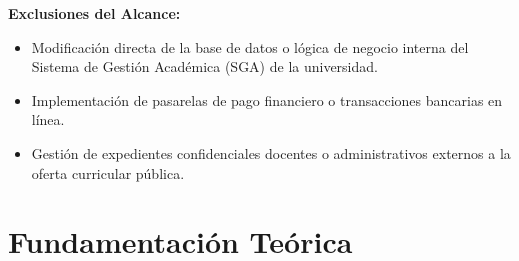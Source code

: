 \textbf{Exclusiones del Alcance:}
\begin{itemize}
  \item Modificación directa de la base de datos o lógica de negocio interna del Sistema de Gestión Académica (SGA) de la universidad.
  \item Implementación de pasarelas de pago financiero o transacciones bancarias en línea.
  \item Gestión de expedientes confidenciales docentes o administrativos externos a la oferta curricular pública.
\end{itemize}

\section{Fundamentación Teórica}

